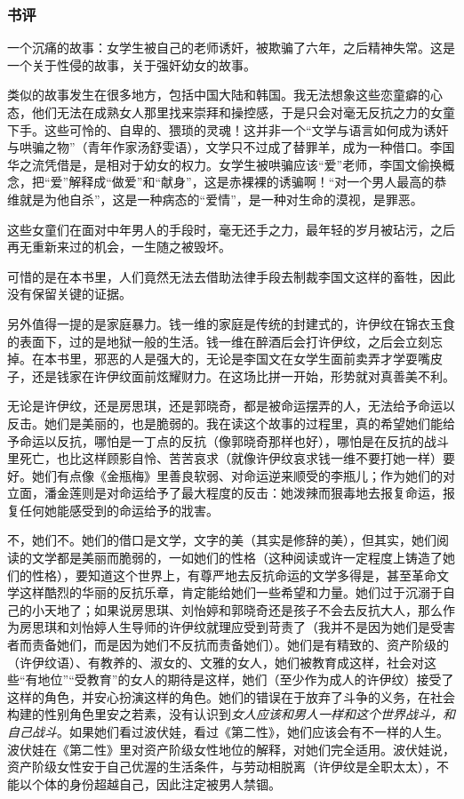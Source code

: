 \subsubsection{书评}

一个沉痛的故事：女学生被自己的老师诱奸，被欺骗了六年，之后精神失常。这是一个关于性侵的故事，关于强奸幼女的故事。

类似的故事发生在很多地方，包括中国大陆和韩国。我无法想象这些恋童癖的心态，他们无法在成熟女人那里找来崇拜和操控感，于是只会对毫无反抗之力的女童下手。这些可怜的、自卑的、猥琐的灵魂！这并非一个“文学与语言如何成为诱奸与哄骗之物”（青年作家汤舒雯语），文学只不过成了替罪羊，成为一种借口。李国华之流凭借是，是相对于幼女的权力。女学生被哄骗应该“爱”老师，李国文偷换概念，把“爱”解释成“做爱”和“献身”，这是赤裸裸的诱骗啊！“对一个男人最高的恭维就是为他自杀”，这是一种病态的“爱情”，是一种对生命的漠视，是罪恶。

这些女童们在面对中年男人的手段时，毫无还手之力，最年轻的岁月被玷污，之后再无重新来过的机会，一生随之被毁坏。

可惜的是在本书里，人们竟然无法去借助法律手段去制裁李国文这样的畜牲，因此没有保留关键的证据。

另外值得一提的是家庭暴力。钱一维的家庭是传统的封建式的，许伊纹在锦衣玉食的表面下，过的是地狱一般的生活。钱一维在醉酒后会打许伊纹，之后会立刻忘掉。在本书里，邪恶的人是强大的，无论是李国文在女学生面前卖弄才学耍嘴皮子，还是钱家在许伊纹面前炫耀财力。在这场比拼一开始，形势就对真善美不利。

无论是许伊纹，还是房思琪，还是郭晓奇，都是被命运摆弄的人，无法给予命运以反击。她们是美丽的，也是脆弱的。我在读这个故事的过程里，真的希望她们能给予命运以反抗，哪怕是一丁点的反抗（像郭晓奇那样也好），哪怕是在反抗的战斗里死亡，也比这样顾影自怜、苦苦哀求（就像许伊纹哀求钱一维不要打她一样）要好。她们有点像《金瓶梅》里善良软弱、对命运逆来顺受的李瓶儿；作为她们的对立面，潘金莲则是对命运给予了最大程度的反击：她泼辣而狠毒地去报复命运，报复任何她能感受到的命运给予的戕害。

不，她们不。她们的借口是文学，文字的美（其实是修辞的美），但其实，她们阅读的文学都是美丽而脆弱的，一如她们的性格（这种阅读或许一定程度上铸造了她们的性格），要知道这个世界上，有尊严地去反抗命运的文学多得是，甚至革命文学这样酷烈的华丽的反抗乐章，肯定能给她们一些希望和力量。她们过于沉溺于自己的小天地了；如果说房思琪、刘怡婷和郭晓奇还是孩子不会去反抗大人，那么作为房思琪和刘怡婷人生导师的许伊纹就理应受到苛责了（我并不是因为她们是受害者而责备她们，而是因为她们不反抗而责备她们）。她们是有精致的、资产阶级的（许伊纹语）、有教养的、淑女的、文雅的女人，她们被教育成这样，社会对这些“有地位”“受教育”的女人的期待是这样，她们（至少作为成人的许伊纹）接受了这样的角色，并安心扮演这样的角色。她们的错误在于放弃了斗争的义务，在社会构建的性别角色里安之若素，没有认识到\emph{女人应该和男人一样和这个世界战斗，和自己战斗}。如果她们看过波伏娃，看过《第二性》，她们应该会有不一样的人生。波伏娃在《第二性》里对资产阶级女性地位的解释，对她们完全适用。波伏娃说，资产阶级女性安于自己优渥的生活条件，与劳动相脱离（许伊纹是全职太太），不能以个体的身份超越自己，因此注定被男人禁锢。

